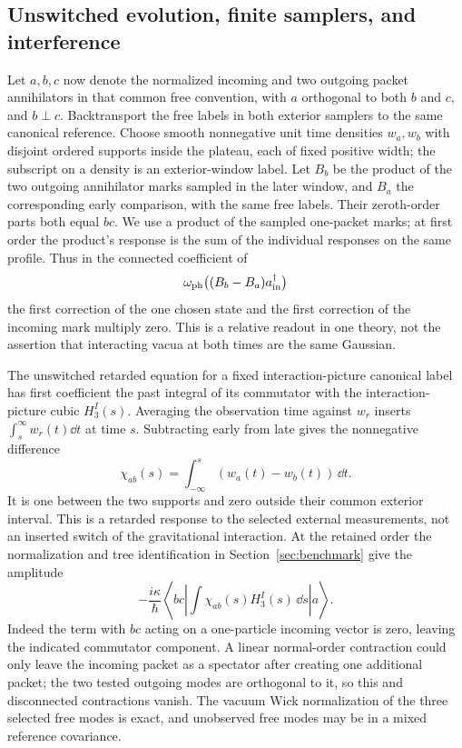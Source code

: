 \subsection{Unswitched evolution, finite samplers, and interference}

Let \(a,b,c\) now denote the normalized incoming and two outgoing packet annihilators in that common free convention, with \(a\) orthogonal to both \(b\) and \(c\), and \(b\perp c\). Backtransport the free labels in both exterior samplers to the same canonical reference. Choose smooth nonnegative unit time densities \(w_a,w_b\) with disjoint ordered supports inside the plateau, each of fixed positive width; the subscript on a density is an exterior-window label. Let \(B_b\) be the product of the two outgoing annihilator marks sampled in the later window, and \(B_a\) the corresponding early comparison, with the same free labels. Their zeroth-order parts both equal \(bc\). We use a product of the sampled one-packet marks; at first order the product's response is the sum of the individual responses on the same profile. Thus in the connected coefficient of
\[
             \omega_{\rm ph}\bigl((B_b-B_a)a^\dagger_{\rm in}\bigr)
\]
the first correction of the one chosen state and the first correction of the incoming mark multiply zero. This is a relative readout in one theory, not the assertion that interacting vacua at both times are the same Gaussian.

The unswitched retarded equation for a fixed interaction-picture canonical label has first coefficient the past integral of its commutator with the interaction-picture cubic \(H_3^{I}(s)\). Averaging the observation time against \(w_r\) inserts \(\int_s^\infty w_r(t)\dd t\) at time \(s\). Subtracting early from late gives the nonnegative difference
\begin{equation}
 \chi_{ab}(s)=\int_{-\infty}^s(w_a(t)-w_b(t))\,\dd t .
 \label{eq:window}
\end{equation}
It is one between the two supports and zero outside their common exterior interval. This is a retarded response to the selected external measurements, not an inserted switch of the gravitational interaction. At the retained order the normalization and tree identification in Section~\ref{sec:benchmark} give the amplitude
\begin{equation}
 -\frac{i\kappa}{\hbar}
   \left\langle bc\left|\int\chi_{ab}(s)H_3^{I}(s)\,\dd s\right|a\right\rangle .
 \label{eq:amplitude}
\end{equation}
Indeed the term with \(bc\) acting on a one-particle incoming vector is zero, leaving the indicated commutator component. A linear normal-order contraction could only leave the incoming packet as a spectator after creating one additional packet; the two tested outgoing modes are orthogonal to it, so this and disconnected contractions vanish. The vacuum Wick normalization of the three selected free modes is exact, and unobserved free modes may be in a mixed reference covariance.

